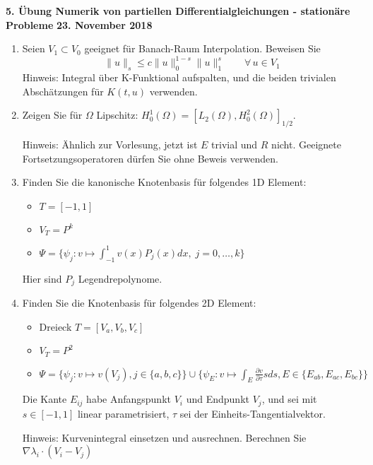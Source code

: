 \documentclass[11pt,a4paper]{report}
\begin{document}
\begin{center}
\textbf{5. \"Ubung Numerik von partiellen Differentialgleichungen - station\"are Probleme} \newline 
\textbf{23. November 2018}
\end{center}
\begin{enumerate}
\item
Seien $V_1 \subset V_0$ geeignet f\"ur Banach-Raum Interpolation. Beweisen Sie
$$
\| u \|_{s} \leq c \|u \|_0^{1-s} \|u \|_1^s \qquad \forall \, u \in V_1
$$
Hinweis: Integral \"uber K-Funktional aufspalten, und die beiden
trivialen Absch\"atzungen f\"ur $K(t,u)$ verwenden.

\item
Zeigen Sie f\"ur $\Omega$ Lipschitz: $H_0^1(\Omega) = [L_2(\Omega),
H_0^2(\Omega)]_{1/2}$.

Hinweis: \"Ahnlich zur Vorlesung, jetzt ist $E$ trivial und $R$
nicht. Geeignete Fortsetzungsoperatoren d\"urfen Sie ohne Beweis verwenden. 

\item
Finden Sie die kanonische \glqq Knotenbasis \grqq  f\"ur folgendes 1D Element: 
\begin{itemize}
\item $T = [-1,1]$
\item $V_T = P^k$
\item $\Psi = \{ \psi_j : v \mapsto \int_{-1}^1 v(x) P_j(x)  dx,  \; j = 0, \ldots, k \}$ 
\end {itemize}
Hier sind $P_j$ Legendrepolynome.


\item Finden Sie die Knotenbasis f\"ur folgendes 2D Element:
\begin{itemize}
\item Dreieck $T = [V_a, V_b, V_c]$
\item $V_T = P^2$
\item $\Psi = \{ \psi_j : v \mapsto v(V_j), j \in \{ a, b, c \} \}
  \cup \{ \psi_E : v \mapsto \int_E \frac{\partial v}{\partial \tau} s
  ds
  , E \in \{ E_{ab}, E_{ac}, E_{bc} \}\}$
\end{itemize}
Die Kante $E_{ij}$ habe Anfangspunkt $V_i$ und Endpunkt $V_j$, und
sei mit $s \in [-1,1]$ linear parametrisiert, $\tau$ sei der
Einheits-Tangentialvektor.

Hinweis: Kurvenintegral einsetzen und ausrechnen. Berechnen Sie
$\nabla \lambda_i \cdot (V_i - V_j)$


\end{enumerate}
\end{document}
